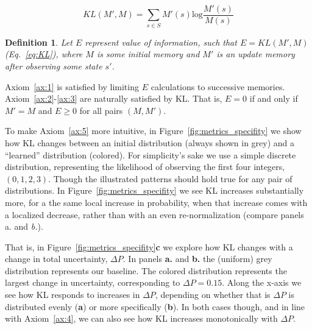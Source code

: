 \documentclass[9pt,twocolumn,twoside]{pnas-new}
\newtheorem{definition}{Definition}
\begin{document}
\begin{equation}
    KL(M', M) = \sum_{s \in S} M'(s) \text{log} \frac{M'(s)}{M(s)} 
    \label{eq:KL}
\end{equation}

\begin{definition}
    Let $E$ represent value of information, such that $E = KL(M', M)$ (Eq.~\ref{eq:KL}), where $M$ is some initial memory and $M'$ is an update memory after observing some state $s'$.
\end{definition}

Axiom~\ref{ax:1} is satisfied by limiting $E$ calculations to successive memories. Axiom~\ref{ax:2}-\ref{ax:3} are naturally satisfied by KL. That is, $E = 0$ if and only if $M' = M$ and $E \geq 0$ for all pairs $(M, M')$.

To make Axiom~\ref{ax:5} more intuitive, in Figure~\ref{fig:metrics_specifity} we show how KL changes between an initial distribution (always shown in grey) and a ``learned'' distribution (colored). For simplicity's sake we use a simple discrete distribution, representing the likelihood of observing the first four integers, $(0,1,2,3)$. Though the illustrated patterns should hold true for any pair of distributions. In Figure~\ref{fig:metrics_specifity} we see KL increases substantially more, for a the same local increase in probability, when that increase comes with a localized decrease, rather than with an even re-normalization (compare panels \textit{}{a.} and \textit{b.}). 

That is, in Figure~\ref{fig:metrics_specifity}\textbf{c} we explore how KL changes with a change in total uncertainty, $\Delta P$. In panels \textbf{a.} and \textbf{b.} the (uniform) grey distribution represents our baseline. The colored distribution represents the largest change in uncertainty, corresponding to $\Delta P = 0.15$. Along the x-axis we see how KL responds to increases in $\Delta P$, depending on whether that is $\Delta P$ is distributed evenly (\textbf{a}) or more specifically (\textbf{b}). In both cases though, and in line with Axiom~\ref{ax:4}, we can also see how KL increases monotonically with $\Delta P$.
\end{document}

